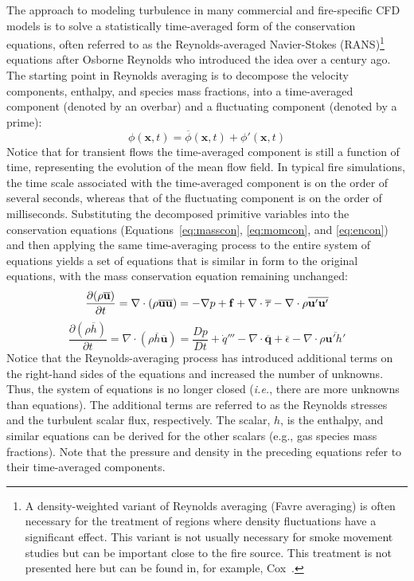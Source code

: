 \documentclass[graybox]{svmult}
\begin{document}
The approach to modeling turbulence in many commercial and fire-specific CFD models is to solve a statistically time-averaged form of the conservation equations, often referred to as the Reynolds-averaged Navier-Stokes (RANS)\footnote{A density-weighted variant of Reynolds averaging (Favre averaging) is often necessary for the treatment of regions where density fluctuations have a significant effect. This variant is not usually necessary for smoke movement studies but can be important close to the fire source. This treatment is not presented here but can be found in, for example, Cox~\cite{Cox:1995}.} equations after Osborne Reynolds who introduced the idea over a century ago. The starting point in Reynolds averaging is to decompose the velocity components, enthalpy, and species mass fractions, into a time-averaged component (denoted by an overbar) and a fluctuating component (denoted by a prime):
\begin{equation}
\phi(\mathbf{x},t) = \overline{\phi}(\mathbf{x},t) + \phi'(\mathbf{x},t)
\label{eq:phidef}
\end{equation}
Notice that for transient flows the time-averaged component is still a function of time, representing the evolution of the mean flow field. In typical fire simulations, the time scale associated with the time-averaged component is on the order of several seconds, whereas that of the fluctuating component is on the order of milliseconds. Substituting the decomposed primitive variables into the conservation equations (Equations~\ref{eq:masscon}, \ref{eq:momcon}, and \ref{eq:encon}) and then applying the same time-averaging process to the entire system of equations yields a set of equations that is similar in form to the original equations, with the mass conservation equation remaining unchanged:
\begin{equation}
\frac{\partial (\rho \overline{\mathbf{u}})}{\partial t} = \nabla \cdot (\rho \overline{\mathbf{u}} \overline{\mathbf{u}}) = -\nabla p + \mathbf{f} + \nabla \cdot \overline{\tens{\tau}}
- \nabla \cdot \rho \overline{ \mathbf{u}' \mathbf{u}' }
\label{eq:filmomcon}
\end{equation}
\begin{equation}
\frac{\partial (\rho \overline{h})}{\partial t} = \nabla \cdot (\rho \overline{h} \overline{\mathbf{u}}) = \frac{Dp}{Dt} + \dot{q}''' - \nabla \cdot \overline{\mathbf{q}}
+ \overline{\epsilon} - \nabla \cdot \rho \overline{ \mathbf{u}' h' }
\label{eq:filencon}
\end{equation}
Notice that the Reynolds-averaging process has introduced additional terms on the right-hand sides of the equations and increased the number of unknowns. Thus, the system of equations is no longer closed ({\em i.e.}, there are more unknowns than equations). The additional terms are referred to as the Reynolds stresses and the turbulent scalar flux, respectively. The scalar, $h$, is the enthalpy, and similar equations can be derived for the other scalars ({e.g.}, gas species mass fractions). Note that the pressure and density in the preceding equations refer to their time-averaged components.
\end{document}
